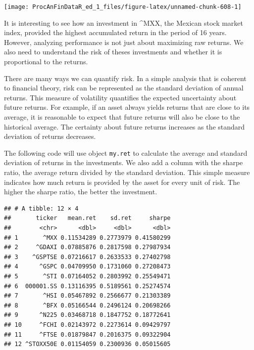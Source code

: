 \documentclass[11pt,]{book}
\newenvironment{Shaded}{\begin{snugshade}}{\end{snugshade}}
\newcommand{\KeywordTok}[1]{\textcolor[rgb]{0.27,0.27,0.27}{\textbf{#1}}}
\newcommand{\DataTypeTok}[1]{\textcolor[rgb]{0.27,0.27,0.27}{#1}}
\newcommand{\StringTok}[1]{\textcolor[rgb]{0.5,0.5,0.5}{#1}}
\newcommand{\OperatorTok}[1]{\textcolor[rgb]{0.81,0.36,0.00}{\textbf{#1}}}
\newcommand{\NormalTok}[1]{#1}
\begin{document}
\begin{center}\texttt{[image: ProcAnFinDataR\_ed\_1\_files/figure-latex/unnamed-chunk-608-1]} \end{center}

It is interesting to see how an investment in \^{}MXX, the Mexican stock
market index, provided the highest accumulated return in the period of
16 years. However, analyzing performance is not just about maximizing
raw returns. We also need to understand the risk of theses investments
and whether it is proportional to the returns.

There are many ways we can quantify risk. In a simple analysis that is
coherent to financial theory, risk can be represented as the standard
deviation of annual returns. This measure of volatility quantifies the
expected uncertainty about future returns. For example, if an asset
always yields returns that are close to its average, it is reasonable to
expect that future returns will also be close to the historical average.
The certainty about future returns increases as the standard deviation
of returns decreases.

The following code will use object \texttt{my.ret} to calculate the
average and standard deviation of returns in the investments. We also
add a column with the sharpe ratio, the average return divided by the
standard deviation. This simple measure indicates how much return is
provided by the asset for every unit of risk. The higher the sharpe
ratio, the better the investment.

\begin{Shaded}
\end{Shaded}

\begin{verbatim}
## # A tibble: 12 × 4
##       ticker   mean.ret    sd.ret     sharpe
##        <chr>      <dbl>     <dbl>      <dbl>
## 1       ^MXX 0.11534289 0.2773979 0.41580299
## 2     ^GDAXI 0.07885876 0.2817598 0.27987934
## 3    ^GSPTSE 0.07216617 0.2633533 0.27402798
## 4      ^GSPC 0.04709950 0.1731060 0.27208473
## 5       ^STI 0.07164052 0.2803992 0.25549471
## 6  000001.SS 0.13116395 0.5189561 0.25274574
## 7       ^HSI 0.05467892 0.2566677 0.21303389
## 8       ^BFX 0.05166544 0.2496124 0.20698266
## 9      ^N225 0.03468718 0.1847752 0.18772641
## 10     ^FCHI 0.02143972 0.2273614 0.09429797
## 11     ^FTSE 0.01879847 0.2016375 0.09322904
## 12 ^STOXX50E 0.01154059 0.2300936 0.05015605
\end{verbatim}
\end{document}
